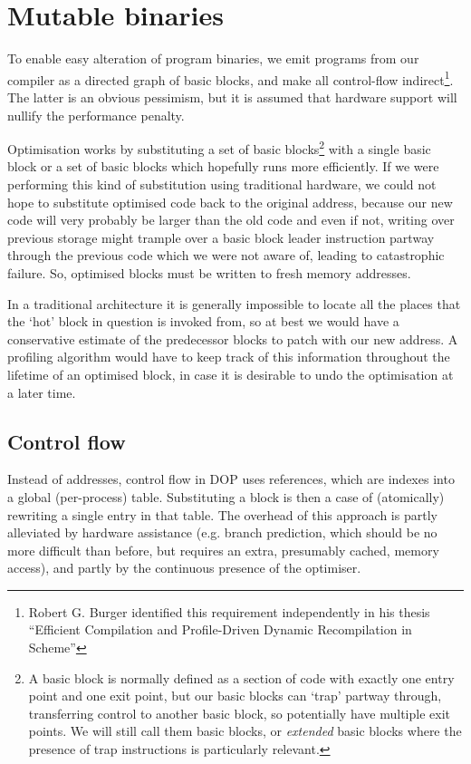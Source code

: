 \section{Mutable binaries}

To enable easy alteration of program binaries, we emit programs from our compiler as a directed graph of basic blocks, and make all control-flow indirect\footnote{Robert G. Burger identified this requirement independently in his thesis ``Efficient Compilation and Profile-Driven Dynamic Recompilation in Scheme''}. The latter is an obvious pessimism, but it is assumed that hardware support will nullify the performance penalty.

Optimisation works by substituting a set of basic blocks\footnote{A basic block is normally defined as a section of code with exactly one entry point and one exit point, but our basic blocks can `trap' partway through, transferring control to another basic block, so potentially have multiple exit points. We will still call them basic blocks, or \emph{extended} basic blocks where the presence of trap instructions is particularly relevant.} with a single basic block or a set of basic blocks which hopefully runs more efficiently. If we were performing this kind of substitution using traditional hardware, we could not hope to substitute optimised code back to the original address, because our new code will very probably be larger than the old code and even if not, writing over previous storage might trample over a basic block leader instruction partway through the previous code which we were not aware of, leading to catastrophic failure. So, optimised blocks must be written to fresh memory addresses.

In a traditional architecture it is generally impossible to locate all the places that the `hot' block in question is invoked from, so at best we would have a conservative estimate of the predecessor blocks to patch with our new address. A profiling algorithm would have to keep track of this information throughout the lifetime of an optimised block, in case it is desirable to undo the optimisation at a later time.

\subsection{Control flow}

Instead of addresses, control flow in DOP uses references, which are indexes into a global (per-process) table. Substituting a block is then a case of (atomically) rewriting a single entry in that table. The overhead of this approach is partly alleviated by hardware assistance (e.g. branch prediction, which should be no more difficult than before, but requires an extra, presumably cached, memory access), and partly by the continuous presence of the optimiser.

